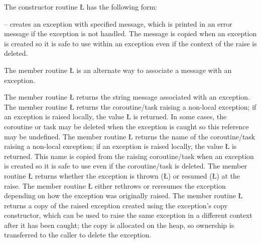 \documentclass[openright,twoside]{report}
\begin{document}
The constructor routine \LGinlinetrue\LGbegin\lgrinde\L{}\endlgrinde\LGend{} has the following form:
\begin{prefix}
\item[\LGinlinetrue\LGbegin\lgrinde\L{\LB{\V{uBaseEvent}(\0\K{const}\0\K{char}\0\*\0\K{const}\0\V{msg}\0=\0\S{}\"\"\SE{}\0)}}\endlgrinde\LGend{}]
-- creates an exception with specified message, which is printed in an error message if the exception is not handled.
The message is copied when an exception is created so it is safe to use within an exception even if the context of the raise is deleted.
\end{prefix}
The member routine \LGinlinetrue\LGbegin\lgrinde\L{}\endlgrinde\LGend{} is an alternate way to associate a message with an exception.

The member routine \LGinlinetrue\LGbegin\lgrinde\L{}\endlgrinde\LGend{} returns the string message associated with an exception.
The member routine \LGinlinetrue\LGbegin\lgrinde\L{}\endlgrinde\LGend{} returns the coroutine/task raising a non-local exception;
if an exception is raised locally, the value \LGinlinetrue\LGbegin\lgrinde\L{}\endlgrinde\LGend{} is returned.
In some cases, the coroutine or task may be deleted when the exception is caught so this reference may be undefined.
The member routine \LGinlinetrue\LGbegin\lgrinde\L{}\endlgrinde\LGend{} returns the name of the coroutine/task raising a non-local exception;
if an exception is raised locally, the value \LGinlinetrue\LGbegin\lgrinde\L{}\endlgrinde\LGend{} is returned.
This name is copied from the raising coroutine/task when an exception is created so it is safe to use even if the coroutine/task is deleted.
The member routine \LGinlinetrue\LGbegin\lgrinde\L{}\endlgrinde\LGend{} returns whether the exception is thrown (\LGinlinetrue\LGbegin\lgrinde\L{}\endlgrinde\LGend{}) or resumed (\LGinlinetrue\LGbegin\lgrinde\L{}\endlgrinde\LGend{}) at the raise.
The member routine \LGinlinetrue\LGbegin\lgrinde\L{}\endlgrinde\LGend{} either rethrows or reresumes the exception depending on how the exception was originally raised.
The member routine \LGinlinetrue\LGbegin\lgrinde\L{}\endlgrinde\LGend{} returns a copy of the raised exception created using the exception's copy constructor, which can be used to raise the same exception in a different context after it has been caught;
the copy is allocated on the heap, so ownership is transferred to the caller to delete the exception.
\end{document}
